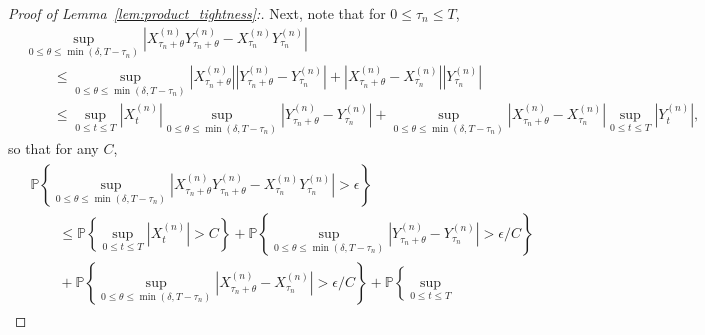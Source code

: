 \documentclass[EJP]{ejpecp} %
\newcommand{\IP}{\mathbb P}
\begin{document}
\begin{proof}[Proof of Lemma~\ref{lem:product_tightness}:]
    Next, note that for $0 \le \tau_n \le T$,
    \begin{align*}
        &
        \sup_{0 \le \theta \le \min(\delta, T-\tau_n)} 
        \left|
            X^{(n)}_{\tau_n + \theta} Y^{(n)}_{\tau_n + \theta} 
            -
            X^{(n)}_{\tau_n} Y^{(n)}_{\tau_n} 
        \right|
        \\ &\qquad 
        \le
        \sup_{0 \le \theta \le \min(\delta, T-\tau_n)} 
        \left| X^{(n)}_{\tau_n + \theta} \right|
        \left|
            Y^{(n)}_{\tau_n + \theta} 
            -
            Y^{(n)}_{\tau_n} 
        \right|
        +
        \left|
            X^{(n)}_{\tau_n + \theta}
            -
            X^{(n)}_{\tau_n}
        \right|
        \left| Y^{(n)}_{\tau_n} \right|
        \\ &\qquad 
        \le
        \sup_{0 \le t \le T}
            \left| X^{(n)}_t \right|
        \sup_{0 \le \theta \le \min(\delta, T-\tau_n)} 
        \left|
            Y^{(n)}_{\tau_n + \theta} 
            -
            Y^{(n)}_{\tau_n} 
        \right|
        +
        \sup_{0 \le \theta \le \min(\delta, T-\tau_n)} 
        \left|
            X^{(n)}_{\tau_n + \theta}
            -
            X^{(n)}_{\tau_n}
        \right|
        \sup_{0 \le t \le T}
        \left| Y^{(n)}_t \right| ,
    \end{align*}
    so that for any $C$,
    \begin{align} \label{eqn:xy_bound}
        \begin{split}
        &
        \IP\left\{
        \sup_{0 \le \theta \le \min(\delta, T-\tau_n)} 
        \left|
            X^{(n)}_{\tau_n + \theta} Y^{(n)}_{\tau_n + \theta} 
            -
            X^{(n)}_{\tau_n} Y^{(n)}_{\tau_n} 
        \right|
        > \epsilon
        \right\}
    \\ &\qquad \le
        \IP\left\{
            \sup_{0 \le t \le T}
                \left| X^{(n)}_t \right|
            > C
        \right\}
    +
        \IP\left\{
        \sup_{0 \le \theta \le \min(\delta, T-\tau_n)} 
        \left|
            Y^{(n)}_{\tau_n + \theta} 
            -
            Y^{(n)}_{\tau_n} 
        \right|
            > \epsilon/C
        \right\}
    \\ &\qquad {} +
        \IP\left\{
        \sup_{0 \le \theta \le \min(\delta, T-\tau_n)} 
        \left|
            X^{(n)}_{\tau_n + \theta} 
            -
            X^{(n)}_{\tau_n} 
        \right|
            > \epsilon/C
        \right\}
    +
        \IP\left\{
            \sup_{0 \le t \le T}

\end{split}
\end{align}
\end{proof}
\end{document}
